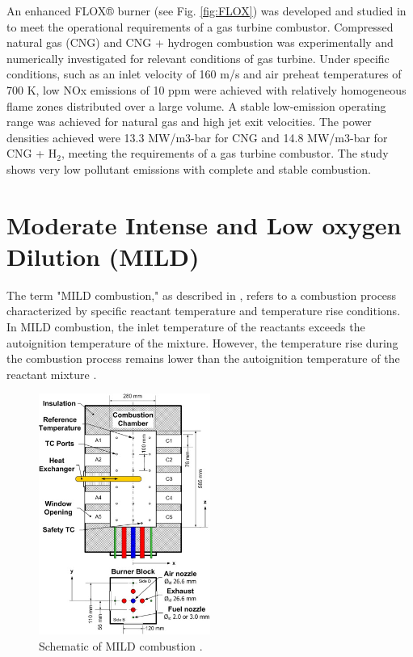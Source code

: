 An enhanced FLOX® burner (see Fig. \ref{fig:FLOX}) was developed and studied in \cite{LAMMEL4001825} to meet the operational requirements of a gas turbine combustor. Compressed natural gas (CNG) and CNG + hydrogen combustion was experimentally and numerically investigated for relevant conditions of gas turbine. Under specific conditions, such as an inlet velocity of 160 m/s and air preheat temperatures of 700 K, low NOx emissions of 10 ppm were achieved with relatively homogeneous flame zones distributed over a large volume. A stable low-emission operating range was achieved for natural gas and high jet exit velocities.  The power densities achieved were 13.3 MW/m3-bar for CNG and 14.8 MW/m3-bar for CNG + H$_2$, meeting the requirements of a gas turbine combustor\cite{doi:10.1021/ef402357t}. The study shows very low pollutant emissions with complete and stable combustion.

\section{Moderate Intense and Low oxygen Dilution (MILD)}

The term "MILD combustion," as described in \cite{CAVALIERE2004329}, refers to a combustion process characterized by specific reactant temperature and temperature rise conditions. In MILD combustion, the inlet temperature of the reactants exceeds the autoignition temperature of the mixture. However, the temperature rise during the combustion process remains lower than the autoignition temperature of the reactant mixture \cite{doi:10.1021/acs.energyfuels.7b03607}.

\begin{figure}
    \centering
    \includegraphics[width=0.5\textwidth]{Chapter2/Images/MILD.jpg}
    \caption[Schematic of MILD combustion]{Schematic of MILD combustion \cite{SZEGO2009429}.}
    \label{fig:MILD}
\end{figure}

